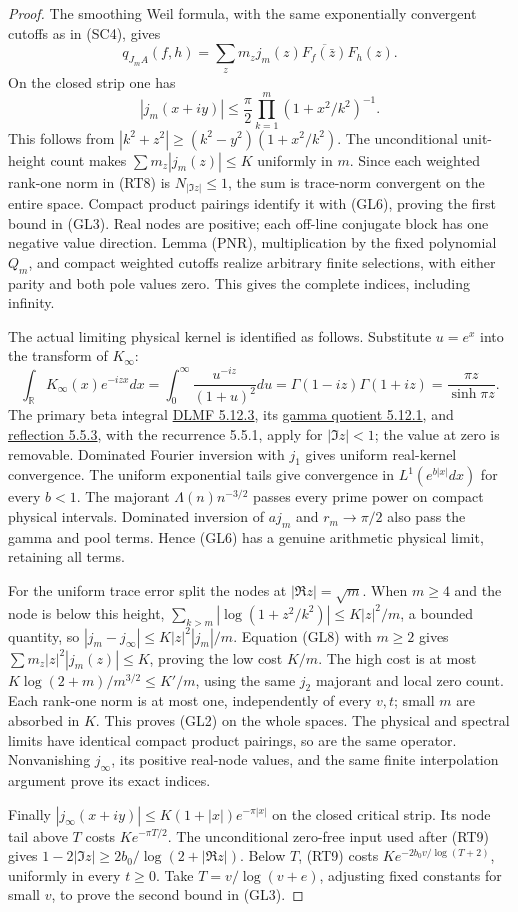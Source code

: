 \documentclass[11pt]{article}
\theoremstyle{remark}\newtheorem{remark}[theorem]{Remark}
\newcommand{\R}{\mathbb R}
\begin{document}
\begin{proof}
The smoothing Weil formula, with the same exponentially convergent
cutoffs as in (SC4), gives
\[
 q_{J_mA}(f,h)=\sum_zm_zj_m(z)\overline{F_f(\bar z)}F_h(z).
                                                               \tag{GL7}
\]
On the closed strip one has
\[
 |j_m(x+iy)|\le\frac\pi2\prod_{k=1}^m(1+x^2/k^2)^{-1}.\tag{GL8}
\]
This follows from
\(|k^2+z^2|\ge(k^2-y^2)(1+x^2/k^2)\).
The unconditional unit-height count makes
\(\sum m_z|j_m(z)|\le K\) uniformly in \(m\).
Since each weighted rank-one norm in (RT8) is \(N_{|\Im z|}\le1\),
the sum is trace-norm convergent on the entire space. Compact
product pairings identify it with (GL6), proving the first bound
in (GL3). Real nodes are positive; each off-line conjugate block
has one negative value direction. Lemma (PNR), multiplication by
the fixed polynomial \(Q_m\), and compact weighted cutoffs realize
arbitrary finite selections, with either parity and both pole
values zero. This gives the complete indices, including infinity.

The actual limiting physical kernel is identified as follows.
Substitute \(u=e^x\) into the transform of \(K_\infty\):
\[
 \int_\R K_\infty(x)e^{-izx}dx
 =\int_0^\infty\frac{u^{-iz}}{(1+u)^2}du
 =\Gamma(1-iz)\Gamma(1+iz)=\frac{\pi z}{\sinh\pi z}.
\]
The primary beta integral
\href{https://dlmf.nist.gov/5.12.E3}{DLMF 5.12.3}, its
\href{https://dlmf.nist.gov/5.12.E1}{gamma quotient 5.12.1}, and
\href{https://dlmf.nist.gov/5.5.E3}{reflection 5.5.3}, with
the recurrence 5.5.1, apply for \(|\Im z|<1\); the value at
zero is removable. Dominated Fourier inversion with \(j_1\)
gives uniform real-kernel convergence. The uniform exponential
tails give convergence in \(L^1(e^{b|x|}dx)\) for every \(b<1\).
The majorant \(\Lambda(n)n^{-3/2}\) passes every prime power on
compact physical intervals. Dominated inversion of \(aj_m\) and
\(r_m\to\pi/2\) also pass the gamma and pool terms. Hence (GL6)
has a genuine arithmetic physical limit, retaining all terms.

For the uniform trace error split the nodes at \(|\Re z|=\sqrt m\).
When \(m\ge4\) and the node is below this height,
\(\sum_{k>m}|\log(1+z^2/k^2)|\le K|z|^2/m\), a bounded
quantity, so
\(|j_m-j_\infty|\le K|z|^2|j_m|/m\).
Equation (GL8) with \(m\ge2\) gives
\(\sum m_z|z|^2|j_m(z)|\le K\), proving the low cost \(K/m\).
The high cost is at most
\(K\log(2+m)/m^{3/2}\le K'/m\), using the same \(j_2\)
majorant and local zero count. Each rank-one norm is at most
one, independently of every \(v,t\); small \(m\) are absorbed
in \(K\). This proves (GL2) on the whole spaces. The physical
and spectral limits have identical compact product pairings,
so are the same operator. Nonvanishing \(j_\infty\), its positive
real-node values, and the same finite interpolation argument
prove its exact indices.

Finally \(|j_\infty(x+iy)|\le K(1+|x|)e^{-\pi|x|}\) on the
closed critical strip. Its node tail above \(T\) costs
\(Ke^{-\pi T/2}\). The unconditional zero-free input used after
(RT9) gives \(1-2|\Im z|\ge2b_0/\log(2+|\Re z|)\).
Below \(T\), (RT9) costs \(Ke^{-2b_0v/\log(T+2)}\), uniformly
in every \(t\ge0\). Take \(T=v/\log(v+e)\), adjusting fixed
constants for small \(v\), to prove the second bound in (GL3).
\end{proof}
\end{document}
